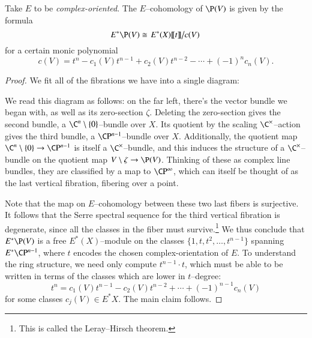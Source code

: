 \begin{theorem}\label{CohomologyOfProjectivization}
Take $E$ to be \emph{complex-oriented}.  The $E$--cohomology of $\P(V)$ is given by the formula \[E^* \P(V) \cong \left. E^*(X) \llbracket t \rrbracket \middle/ c(V) \right.\] for a certain monic polynomial \[c(V) = t^n - c_1(V) t^{n-1} + c_2(V) t^{n-2} - \cdots + (-1)^n c_n(V).\]
\end{theorem}
\begin{proof}
We fit all of the fibrations we have into a single diagram:
\begin{center}
\end{center}
We read this diagram as follows: on the far left, there's the vector bundle we began with, as well as its zero-section $\zeta$.  Deleting the zero-section gives the second bundle, a $\C^n \setminus \{0\}$--bundle over $X$.  Its quotient by the scaling $\C^\times$--action gives the third bundle, a $\CP^{n-1}$--bundle over $X$.  Additionally, the quotient map $\C^n \setminus \{0\} \to \CP^{n-1}$ is itself a $\C^\times$--bundle, and this induces the structure of a $\C^\times$--bundle on the quotient map $V \setminus \zeta \to \P(V)$.  Thinking of these as complex line bundles, they are classified by a map to $\CP^\infty$, which can itself be thought of as the last vertical fibration, fibering over a point.

Note that the map on $E$--cohomology between these two last fibers is surjective.  It follows that the Serre spectral sequence for the third vertical fibration is degenerate, since all the classes in the fiber must survive.\footnote{This is called the Leray--Hirsch theorem.}  We thus conclude that $E^* \P(V)$ is a free $E^*(X)$--module on the classes $\{1, t, t^2, \ldots, t^{n-1}\}$ spanning $E^* \CP^{n-1}$, where $t$ encodes the chosen complex-orientation of $E$.  To understand the ring structure, we need only compute $t^{n-1} \cdot t$, which must be able to be written in terms of the classes which are lower in $t$--degree: \[t^n = c_1(V) t^{n-1} - c_2(V) t^{n-2} + \cdots + (-1)^{n-1} c_n(V)\] for some classes $c_j(V) \in E^* X$.  The main claim follows.
\end{proof}

